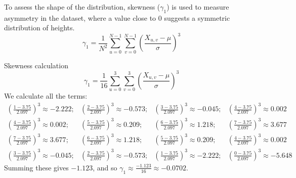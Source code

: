 To assess the shape of the distribution, skewness ($\gamma_1$) is used to measure asymmetry in the dataset, where a value close to 0 suggests a symmetric 
distribution of heights. 
\[\gamma_1=\frac{1}{N^2}\sum_{u=0}^{N-1}\sum_{v=0}^{N-1}{\left(\frac{X_{u,v}-\mu}{\sigma}\right)}^3\]
\begin{example}{Skewness calculation}
    \[\gamma_1=\frac{1}{16}\sum_{u=0}^{3}\sum_{v=0}^{3}{\left(\frac{X_{u,v}-\mu}{\sigma}\right)}^3\]
    We calculate all the terms:
    \begin{equation*}
        \begin{matrix}
            {\left(\frac{1-3.75}{2.097}\right)}^3\approx-2.222; & {\left(\frac{2-3.75}{2.097}\right)}^3\approx-0.573; & {\left(\frac{3-3.75}{2.097}\right)}^3\approx-0.045; & {\left(\frac{4-3.75}{2.097}\right)}^3\approx0.002 \\
            {\left(\frac{4-3.75}{2.097}\right)}^3\approx0.002; & {\left(\frac{5-3.75}{2.097}\right)}^3\approx0.209; & {\left(\frac{6-3.75}{2.097}\right)}^3\approx1.218; & {\left(\frac{7-3.75}{2.097}\right)}^3\approx3.677 \\
            {\left(\frac{7-3.75}{2.097}\right)}^3\approx3.677; & {\left(\frac{6-3.75}{2.097}\right)}^3\approx1.218; & {\left(\frac{5-3.75}{2.097}\right)}^3\approx0.209; & {\left(\frac{4-3.75}{2.097}\right)}^3\approx0.002 \\
            {\left(\frac{3-3.75}{2.097}\right)}^3\approx-0.045; & {\left(\frac{2-3.75}{2.097}\right)}^3\approx-0.573; & {\left(\frac{1-3.75}{2.097}\right)}^3\approx-2.222; & {\left(\frac{0-3.75}{2.097}\right)}^3\approx-5.648
        \end{matrix}
    \end{equation*}
    Summing these gives $-1.123$, and so $\gamma_1\approx\frac{-1.123}{16}\approx-0.0702$.
\end{example}

